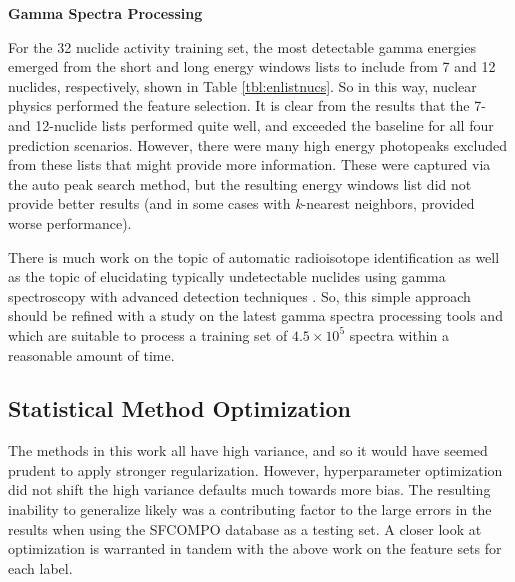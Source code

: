 \noindent \textbf{Gamma Spectra Processing}

For the 32 nuclide activity training set, the most detectable gamma energies
emerged from the short and long energy windows lists to include from 7 and 12
nuclides, respectively, shown in Table \ref{tbl:enlistnucs}. So in this way,
nuclear physics performed the feature selection.  It is clear from the results
that the 7- and 12-nuclide lists performed quite well, and exceeded the
baseline for all four prediction scenarios.  However, there were many high
energy photopeaks excluded from these lists that might provide more
information. These were captured via the auto peak search method, but the
resulting energy windows list did not provide better results (and in some cases
with \textit{k}-nearest neighbors, provided worse performance).  

There is much work on the topic of automatic radioisotope identification
\cite{riid_09, rapid_riid_18, sull_gen_07, sull_valid_15, sull_auto_17,
sull_unc_17, dayman_gamma_fp, dayman_gamma_auto} as well as the topic of
elucidating typically undetectable nuclides using gamma spectroscopy with
advanced detection techniques \cite{compton_supp, snf_gamma}.  So, this simple
approach should be refined with a study on the latest gamma spectra processing
tools and which are suitable to process a training set of $4.5 \times 10^5$
spectra within a reasonable amount of time.  


\subsection{Statistical Method Optimization}

The methods in this work all have high variance, and so it would have seemed
prudent to apply stronger regularization. However, hyperparameter optimization
did not shift the high variance defaults much towards more bias.  The resulting
inability to generalize likely was a contributing factor to the large errors in
the results when using the \gls{SFCOMPO} database as a testing set. A closer
look at optimization is warranted in tandem with the above work on the feature
sets for each label.

